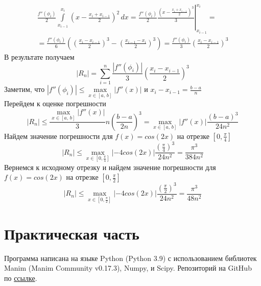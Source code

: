 \documentclass[a5paper, 10pt]{article}
\theoremstyle{definition}
\theoremstyle{plain}
\theoremstyle{remark}
\begin{document}
\\
\begin{multline}
\frac{f'' \left(\phi_i \right)}{2} \int\limits_{x_{i-1}}^{x_{i}} \left(x - \frac{x_{i} + x_{i-1}}{2} \right)^2  \,dx = \frac{f'' \left(\phi_i \right)}{2} \left. \frac{\left(x - \frac{x_{i} + x_{i-1}}{2} \right)^3}{3} \right|_{x_{i-1}}^{x_{i}} = \\ = \frac{f'' \left(\phi_i \right)}{6} \left( \left(\frac{x_{i} - x_{i-1}}{2}\right)^3 - \left( \frac{x_{i-1} - x_{i}}{2}\right)^3 \right) = \frac{f'' \left(\phi_i \right)}{3}  \left(\frac{x_{i} - x_{i-1}}{2}\right)^3
\end{multline}
В результате получаем
\begin{equation}
\left|R_n\right| = \sum\limits_{i=1}^n \frac{\left| f'' \left(\phi_i \right) \right| }{3} \left(\frac{x_{i} - x_{i-1}}{2} \right)^3  
\end{equation}
Заметим, что $ \left| f'' \left(\phi_i \right) \right| \leqslant \max\limits_{x \in [a,\,b]} \left|f''(x)\right| $  и $x_{i} - x_{i-1} = \frac{b - a}{n}$\\
Перейдем к оценке погрешности
\begin{equation}
\left|R_n\right| \leqslant  \frac{\max\limits_{x \in [a,\,b]} \left|f''(x)\right|}{3} n  \left(\frac{b - a}{2n} \right)^3   = \max\limits_{x \in [a,\,b]} \left|f''(x)\right| \frac{\left(b - a\right)^3}{24 n^2} 
\end{equation}
Найдем значение погрешности  для $f(x) = cos(2x)$ на отрезке $[0, \frac{\pi}{4}]$
\begin{equation}
\left|R_n\right| \leqslant \max\limits_{x \in [0, \frac{\pi}{4}]} \left|-4 cos(2x)\right| \frac{\left(\frac{\pi}{4}\right)^3}{24 n^2} =\frac{\pi^3}{384 n^2}
\end{equation}
Вернемся к исходному отрезку и найдем значение погрешности  для $f(x) = cos(2x)$ на отрезке $[0, \frac{\pi}{2}]$
\begin{equation}
\left|R_n\right| \leqslant \max\limits_{x \in [0, \frac{\pi}{2}]} \left|-4 cos(2x)\right| \frac{\left(\frac{\pi}{2}\right)^3}{24 n^2} =\frac{\pi^3}{48 n^2}
\end{equation}
\newpage
 \section{Практическая часть}
Программа написана на языке Python (Python 3.9) с использованием библиотек Manim (Manim Community v0.17.3), Numpy, и Scipy. Репозиторий на GitHub по \href{https://github.com/a-nechaeva/MathLab}{ссылке}.
\end{document}
